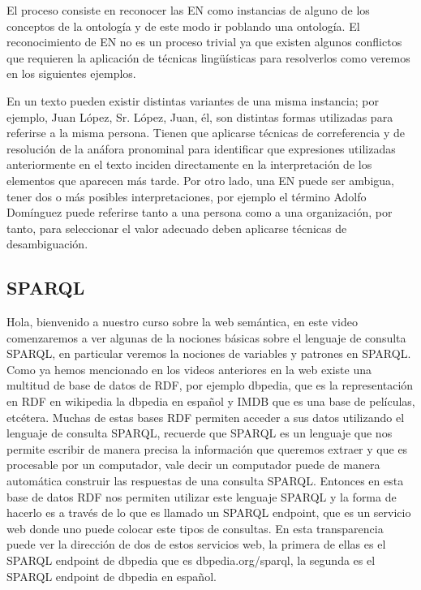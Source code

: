 El proceso consiste en reconocer las EN como instancias de alguno de los conceptos de la ontología y de este modo ir poblando una ontología. El reconocimiento de EN no es un proceso trivial ya que existen algunos conflictos que requieren la aplicación de técnicas lingüísticas para resolverlos como veremos en los siguientes ejemplos.

En un texto pueden existir distintas variantes de una misma instancia; por ejemplo, Juan López, Sr. López, Juan, él, son distintas formas utilizadas para referirse a la misma persona. Tienen que aplicarse técnicas de correferencia y de resolución de la anáfora pronominal para identificar que expresiones utilizadas anteriormente en el texto inciden directamente en la interpretación de los elementos que aparecen más tarde. Por otro lado, una EN puede ser ambigua, tener dos o más posibles interpretaciones, por ejemplo el término Adolfo Domínguez puede referirse tanto a una persona como a una organización, por tanto, para seleccionar el valor adecuado deben aplicarse técnicas de desambiguación.

\subsection{SPARQL}

Hola, bienvenido a nuestro curso sobre la web semántica, en este video comenzaremos a ver algunas de la nociones básicas sobre el lenguaje de consulta SPARQL, en particular veremos la nociones de variables y patrones en SPARQL. Como ya hemos mencionado en los videos anteriores en la web existe una multitud de base de datos de RDF, por ejemplo dbpedia, que es la representación en RDF en wikipedia la dbpedia en español y IMDB que es una base de películas, etcétera. Muchas de estas bases RDF permiten acceder a sus datos utilizando el lenguaje de consulta SPARQL, recuerde que SPARQL es un lenguaje que nos permite escribir de manera precisa la información que queremos extraer y que es procesable por un computador, vale decir un computador puede de manera automática construir las respuestas de una consulta SPARQL. Entonces en esta base de datos RDF nos permiten utilizar este lenguaje SPARQL y la forma de hacerlo es a través de lo que es llamado un SPARQL endpoint, que es un servicio web donde uno puede colocar este tipos de consultas. En esta transparencia puede ver la dirección de dos de estos servicios web, la primera de ellas es el SPARQL endpoint de dbpedia que es dbpedia.org/sparql, la segunda es el SPARQL endpoint de dbpedia en español.

